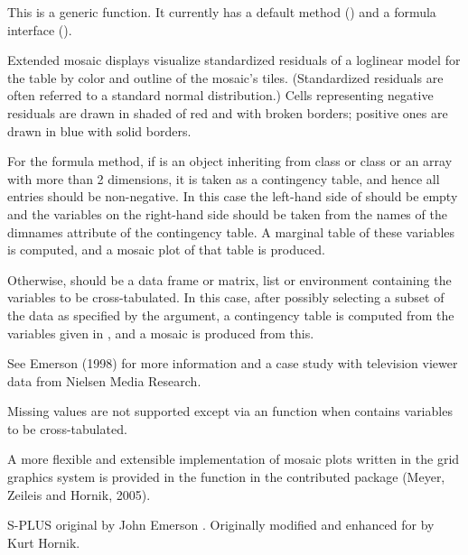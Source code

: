 %
\begin{Details}\relax
This is a generic function.  It currently has a default method
() and a formula interface
().

Extended mosaic displays visualize standardized residuals of a
loglinear model for the table by color and outline of the mosaic's
tiles.  (Standardized residuals are often referred to a standard
normal distribution.)  Cells representing negative residuals are drawn
in shaded of red and with broken borders; positive ones are drawn in
blue with solid borders.

For the formula method, if  is an object inheriting from
class  or class  or an array with more
than 2 dimensions, it is taken as a contingency table, and hence all
entries should be non-negative.  In this case the left-hand side of
 should be empty and the variables on the right-hand
side should be taken from the names of the dimnames attribute of the
contingency table.  A marginal table of these variables is computed,
and a mosaic plot of that table is produced.

Otherwise,  should be a data frame or matrix, list or
environment containing the variables to be cross-tabulated.  In this
case, after possibly selecting a subset of the data as specified by
the  argument, a contingency table is computed from the
variables given in , and a mosaic is produced from
this.

See Emerson (1998) for more information and a case study with
television viewer data from Nielsen Media Research.

Missing values are not supported except via an 
function when  contains variables to be cross-tabulated.

A more flexible and extensible implementation of mosaic plots written
in the grid graphics system is provided in the function
 in the contributed package 
(Meyer, Zeileis and Hornik, 2005).
\end{Details}
%
\begin{Author}\relax
S-PLUS original by John Emerson .
Originally modified and enhanced for \R{} by Kurt Hornik.
\end{Author}
%
